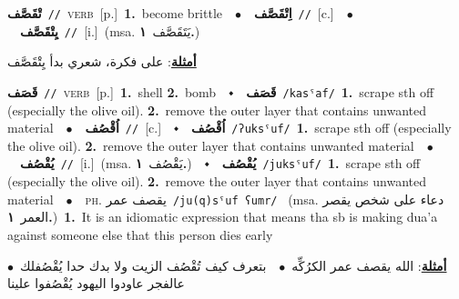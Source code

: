 \documentclass[10pt,a4paper,twoside]{article} %
\begin{document}
\begin{multicols}{2}
{\setlength\topsep{0pt}\textbf{\foreignlanguage{arabic}{تْقَصَّف}}\ {\color{gray}\texttt{//}\color{black}}\ \textsc{verb}\ [p.]\ \textbf{1.}~become brittle\ \ $\bullet$\ \ \setlength\topsep{0pt}\textbf{\foreignlanguage{arabic}{اِتْقَصَّف}}\ {\color{gray}\texttt{//}\color{black}}\ [c.]\ \ $\bullet$\ \ \setlength\topsep{0pt}\textbf{\foreignlanguage{arabic}{يِتْقَصَّف}}\ {\color{gray}\texttt{//}\color{black}}\ [i.]\ \color{gray}(msa. \foreignlanguage{arabic}{يَتَقَصَّف}~\foreignlanguage{arabic}{\textbf{١.}})\color{black}\  \begin{flushright}\color{gray}\foreignlanguage{arabic}{\textbf{\underline{\foreignlanguage{arabic}{أمثلة}}}: على فكرة، شعري بدأ يِتْقَصَّف}\end{flushright}\color{black}} \vspace{2mm}

{\setlength\topsep{0pt}\textbf{\foreignlanguage{arabic}{قَصَف}}\ {\color{gray}\texttt{//}\color{black}}\ \textsc{verb}\ [p.]\ \textbf{1.}~shell  \textbf{2.}~bomb\ \ $\smblkdiamond$\ \ \setlength\topsep{0pt}\textbf{\foreignlanguage{arabic}{قَصَف}}\ {\color{gray}\texttt{/kasˤaf/}\color{black}}\ \textbf{1.}~scrape sth off (especially the olive oil).  \textbf{2.}~remove the outer layer that contains unwanted material\ \ $\bullet$\ \ \setlength\topsep{0pt}\textbf{\foreignlanguage{arabic}{اُقْصُف}}\ {\color{gray}\texttt{//}\color{black}}\ [c.]\ \ $\smblkdiamond$\ \ \setlength\topsep{0pt}\textbf{\foreignlanguage{arabic}{اُقْصُف}}\ {\color{gray}\texttt{/ʔuksˤuf/}\color{black}}\ \textbf{1.}~scrape sth off (especially the olive oil).  \textbf{2.}~remove the outer layer that contains unwanted material\ \ $\bullet$\ \ \setlength\topsep{0pt}\textbf{\foreignlanguage{arabic}{يُقْصُف}}\ {\color{gray}\texttt{//}\color{black}}\ [i.]\ \color{gray}(msa. \foreignlanguage{arabic}{يَقْصُف}~\foreignlanguage{arabic}{\textbf{١.}})\color{black}\ \ $\smblkdiamond$\ \ \setlength\topsep{0pt}\textbf{\foreignlanguage{arabic}{يُقْصُف}}\ {\color{gray}\texttt{/juksˤuf/}\color{black}}\ \textbf{1.}~scrape sth off (especially the olive oil).  \textbf{2.}~remove the outer layer that contains unwanted material\ \ $\bullet$\ \ \textsc{ph.} \color{gray} \foreignlanguage{arabic}{يقصف عمر}\color{black}\ {\color{gray}\texttt{/{\sffamily ju(q)sˤuf ʕumr}/}\color{black}}\ \color{gray} (msa. \foreignlanguage{arabic}{دعاء على شخص يقصر العمر}~\foreignlanguage{arabic}{\textbf{١.}})\color{black}\ \textbf{1.}~It is an idiomatic expression that means tha sb is making dua'a against someone else that this person dies early\  \begin{flushright}\color{gray}\foreignlanguage{arabic}{\textbf{\underline{\foreignlanguage{arabic}{أمثلة}}}: الله يقصف عمر الكرُكِّه\ $\bullet$\ \  بتعرف كيف تُقْصُف الزيت ولا بدك حدا يُقْصُفلك\ $\bullet$\ \  عالفجر عاودوا اليهود يُقْصُفوا علينا}\end{flushright}\color{black}} \vspace{2mm}


\end{multicols}
\end{document}
